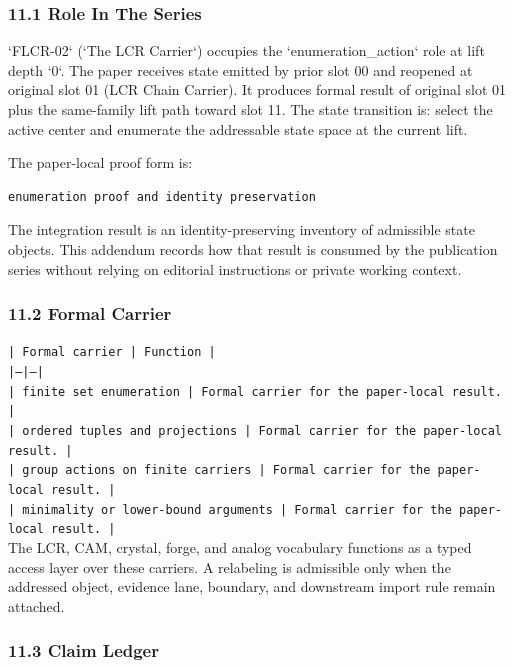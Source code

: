 \documentclass[11pt]{article}
\begin{document}
\subsubsection*{11.1 Role In The Series}

`FLCR-02` (`The LCR Carrier`) occupies the `enumeration\_action` role at lift depth `0`.
The paper receives state emitted by prior slot 00 and reopened at original slot 01 (LCR Chain Carrier). It produces formal result of original slot 01 plus the same-family lift path toward slot 11. The state transition is:
select the active center and enumerate the addressable state space at the current lift.

The paper-local proof form is:

\begin{verbatim}
enumeration proof and identity preservation
\end{verbatim}

The integration result is an identity-preserving inventory of admissible state objects. This addendum records how that result is
consumed by the publication series without relying on editorial instructions or
private working context.

\subsubsection*{11.2 Formal Carrier}

\noindent\texttt{| Formal carrier | Function |}\\
\noindent\texttt{|---|---|}\\
\noindent\texttt{| finite set enumeration | Formal carrier for the paper-local result. |}\\
\noindent\texttt{| ordered tuples and projections | Formal carrier for the paper-local result. |}\\
\noindent\texttt{| group actions on finite carriers | Formal carrier for the paper-local result. |}\\
\noindent\texttt{| minimality or lower-bound arguments | Formal carrier for the paper-local result. |}\\

The LCR, CAM, crystal, forge, and analog vocabulary functions as a typed access
layer over these carriers. A relabeling is admissible only when the addressed
object, evidence lane, boundary, and downstream import rule remain attached.

\subsubsection*{11.3 Claim Ledger}
\end{document}
